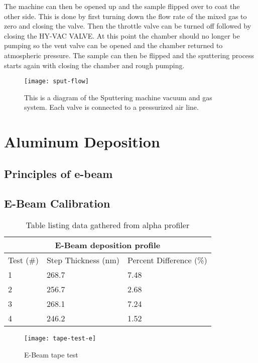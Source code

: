The machine can then be opened up and the sample flipped over to coat the other side.
This is done by first turning down the flow rate of the mixed gas to zero and closing the valve.
Then the throttle valve can be turned off followed by closing the HY-VAC VALVE.
At this point the chamber should no longer be pumping so the vent valve can be opened and the chamber returned to atmospheric pressure.
The sample can then be flipped and the sputtering process starts again with closing the chamber and rough pumping.
\begin{sidewaysfigure}
\texttt{[image: sput-flow]}
\caption{This is a diagram of the Sputtering machine vacuum and gas system. Each valve is connected to a pressurized air line.}
\label{fig:sput-flow}
\end{sidewaysfigure}%
\section{Aluminum Deposition}
\subsection{Principles of e-beam}

\subsection{E-Beam Calibration}

\begin{table}
\centering
\begin{tabular}{ |p{4cm}|p{4cm}|p{4cm}|  }
 \hline
 \multicolumn{3}{|c|}{E-Beam deposition profile} \\
 \hline
 Test (\#)&Step Thickness (nm)&Percent Difference (\%)\\
 \hline
 1   & 268.7    &7.48\\
 2&   256.7  & 2.68\\
 3 &268.1 & 7.24\\
 4    &246.2 & 1.52\\
 \hline
\end{tabular}
\caption{Table listing data gathered from alpha profiler}
\label{table:test-e}
\end{table}

\begin{figure}[htpb]
\centering
\texttt{[image: tape-test-e]}
\caption{E-Beam tape test}
\label{fig:tape-test-e}
\end{figure}

